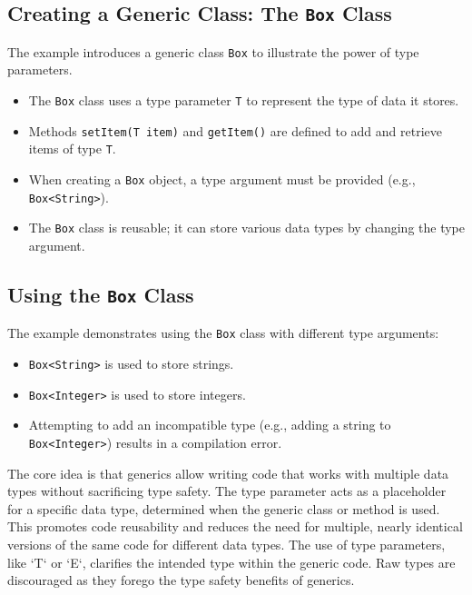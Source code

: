 \documentclass{article}
\begin{document}
\begin{itemize}
\subsection{Creating a Generic Class: The \texttt{Box} Class}

The example introduces a generic class \texttt{Box} to illustrate the power of type parameters.

\begin{itemize}
    \item The \texttt{Box} class uses a type parameter \texttt{T} to represent the type of data it stores.
    \item Methods \texttt{setItem(T item)} and \texttt{getItem()} are defined to add and retrieve items of type \texttt{T}.
    \item When creating a \texttt{Box} object, a type argument must be provided (e.g., \texttt{Box<String>}).
    \item The \texttt{Box} class is reusable; it can store various data types by changing the type argument.
\end{itemize}

\subsection{Using the \texttt{Box} Class}

The example demonstrates using the \texttt{Box} class with different type arguments:

\begin{itemize}
    \item \texttt{Box<String>} is used to store strings.
    \item \texttt{Box<Integer>} is used to store integers.
    \item Attempting to add an incompatible type (e.g., adding a string to \texttt{Box<Integer>}) results in a compilation error.
\end{itemize}

The core idea is that generics allow writing code that works with multiple data types without sacrificing type safety.  The type parameter acts as a placeholder for a specific data type, determined when the generic class or method is used.  This promotes code reusability and reduces the need for multiple, nearly identical versions of the same code for different data types.  The use of type parameters, like `T` or `E`, clarifies the intended type within the generic code.  Raw types are discouraged as they forego the type safety benefits of generics.



\end{itemize}
\end{document}

